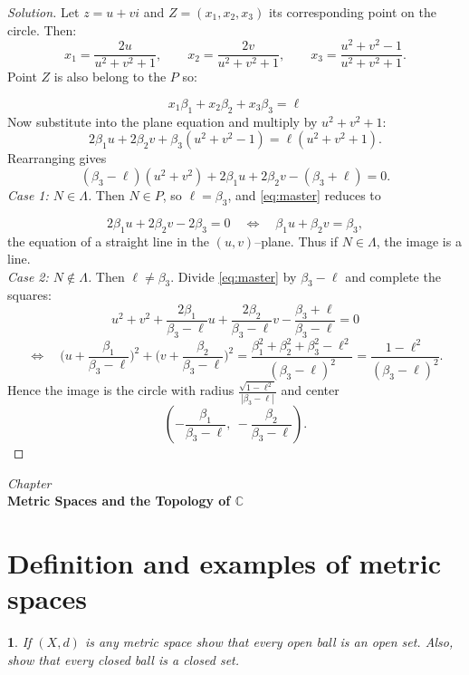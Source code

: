 \documentclass[12pt, a4paper]{report}
\newcommand{\chapter}[1]{%
  \par\vspace{2em}%
  \refstepcounter{section}%
  \begin{center}
    \textit{Chapter \thesection} \\[1.5ex]
    \textbf{#1}
  \end{center}
  \vspace{1em}%
}
\theoremstyle{spaced}
\newtheorem{exercise}{}
\newcommand{\setexercise}[1]{\setcounter{exercise}{#1-1}}
\begin{document}
\begin{proof}[Solution]
	Let \(z=u+vi\) and \(Z=(x_1, x_2, x_3)\) its corresponding point on the circle. Then:
	\[
		x_1=\frac{2u}{u^2+v^2+1},\qquad
		x_2=\frac{2v}{u^2+v^2+1},\qquad
		x_3=\frac{u^2+v^2-1}{u^2+v^2+1}.
	\]
	Point \(Z\) is also belong to the \(P\) so:

	\[
		x_1 \beta_1 + x_2 \beta_2 + x_3 \beta_3 = \ell
	\]
	Now substitute into the plane equation and multiply by $u^2+v^2+1$:
	\[
		2\beta_1u+2\beta_2v+\beta_3(u^2+v^2-1)=\ell(u^2+v^2+1).
	\]
	Rearranging gives
	\begin{equation}\label{eq:master}
		(\beta_3-\ell)(u^2+v^2)+2\beta_1u+2\beta_2v-(\beta_3+\ell)=0.
	\end{equation}
	\emph{Case 1: $N\in\Lambda$.}
	Then $N\in P$, so $\ell=\beta_3$, and \eqref{eq:master} reduces to

	\[
		2\beta_1u+2\beta_2v-2\beta_3=0
		\quad\Longleftrightarrow\quad
		\beta_1u+\beta_2v=\beta_3,
	\]
	the equation of a straight line in the $(u,v)$–plane. Thus if $N\in\Lambda$, the image is a line.\\

	\noindent	\emph{Case 2: $N\notin\Lambda$.}
	Then $\ell\neq\beta_3$. Divide \eqref{eq:master} by $\beta_3-\ell$ and complete the squares:
	\[
		u^2+v^2+\frac{2\beta_1}{\beta_3-\ell}u+\frac{2\beta_2}{\beta_3-\ell}v
		-\frac{\beta_3+\ell}{\beta_3-\ell}=0
	\]
	\[
		\Longleftrightarrow\quad
		\Big(u+\frac{\beta_1}{\beta_3-\ell}\Big)^2+\Big(v+\frac{\beta_2}{\beta_3-\ell}\Big)^2
		=\frac{\beta_1^2+\beta_2^2+\beta_3^2-\ell^2}{(\beta_3-\ell)^2}
		=\frac{1-\ell^2}{(\beta_3-\ell)^2}.
	\]
	Hence the image is the circle with radius \(		\frac{\sqrt{1-\ell^2}}{|\beta_3-\ell|}\) and center
	\[
		\left(-\frac{\beta_1}{\beta_3-\ell},\ -\frac{\beta_2}{\beta_3-\ell}\right).
	\]
\end{proof}

\newpage
\chapter{Metric Spaces and the Topology of $\mathbb{C}$}
\section{Definition and examples of metric spaces}

\setexercise{3}
\begin{exercise}
	If $(X,d)$ is any metric space show that every open ball is an open set.
	Also, show that every closed ball is a closed set.
\end{exercise}
\end{document}
